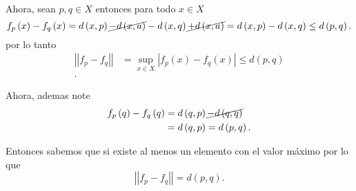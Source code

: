 \documentclass{report}
\begin{document}
Ahora, sean $p, q \in X$ entonces para todo $x \in X$ \[
  f_p\left( x \right) - f_q\left( x \right) = d\left( x, p \right) \cancel{- d\left( x,a \right)} - d\left( x, q \right)  \cancel{ + d\left( x, a \right) } = d\left( x, p \right) - d\left( x, q \right) \le d\left( p, q \right) 
.\] por lo tanto 
\begin{align*}
  \left| \left| f_p - f_q \right|  \right|  &= \sup_{x\in X}\left| f_p\left( x \right) - f_q\left( x \right)  \right| \le d\left( p, q \right)  \\
.\end{align*}

Ahora, ademas note
\begin{align*}
  f_p\left( q \right) - f_q\left( q \right) &= d\left( q, p \right) \cancel{- d\left( q, q \right) }\\
  &=  d\left( q, p \right) = d\left( p, q \right)
.\end{align*}

Entonces sabemos que si existe al menos un elemento con el valor máximo por lo que \[
\left| \left| f_p - f_q \right|  \right| = d\left( p, q \right) 
.\] 
\end{document}
